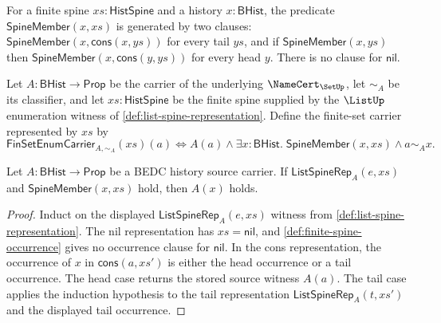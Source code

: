 \begin{definition}
\label{def:finite-spine-occurrence}
For a finite spine $xs:\mathsf{HistSpine}$ and a history $x:\mathsf{BHist}$, the predicate $\mathsf{SpineMember}(x,xs)$ is generated by two clauses: $\mathsf{SpineMember}(x,\mathsf{cons}(x,ys))$ for every tail $ys$, and if $\mathsf{SpineMember}(x,ys)$ then $\mathsf{SpineMember}(x,\mathsf{cons}(y,ys))$ for every head $y$. There is no clause for $\mathsf{nil}$.
\end{definition}

\begin{definition}
\label{def:finset-enumeration-carrier}
Let $A:\mathsf{BHist}\to\mathsf{Prop}$ be the carrier of the underlying $\NameCert_{\SetUp}$, let $\sim_A$ be its classifier, and let $xs:\mathsf{HistSpine}$ be the finite spine supplied by the $\ListUp$ enumeration witness of \autoref{def:list-spine-representation}. Define the finite-set carrier represented by $xs$ by
$$
\mathsf{FinSetEnumCarrier}_{A,\sim_A}(xs)(a)
\Longleftrightarrow
A(a)\land
\exists x:\mathsf{BHist}.\;\mathsf{SpineMember}(x,xs)\land a\sim_A x.
$$
\end{definition}

\begin{lemma}
\label{lem:finset-enumeration-spine-entries-source-carried}
Let $A:\mathsf{BHist}\to\mathsf{Prop}$ be a BEDC history source carrier. If $\mathsf{ListSpineRep}_A(e,xs)$ and $\mathsf{SpineMember}(x,xs)$ hold, then $A(x)$ holds.
\end{lemma}
\begin{proof}
Induct on the displayed $\mathsf{ListSpineRep}_A(e,xs)$ witness from \autoref{def:list-spine-representation}. The nil representation has $xs=\mathsf{nil}$, and \autoref{def:finite-spine-occurrence} gives no occurrence clause for $\mathsf{nil}$. In the cons representation, the occurrence of $x$ in $\mathsf{cons}(a,xs')$ is either the head occurrence or a tail occurrence. The head case returns the stored source witness $A(a)$. The tail case applies the induction hypothesis to the tail representation $\mathsf{ListSpineRep}_A(t,xs')$ and the displayed tail occurrence.
\end{proof}

